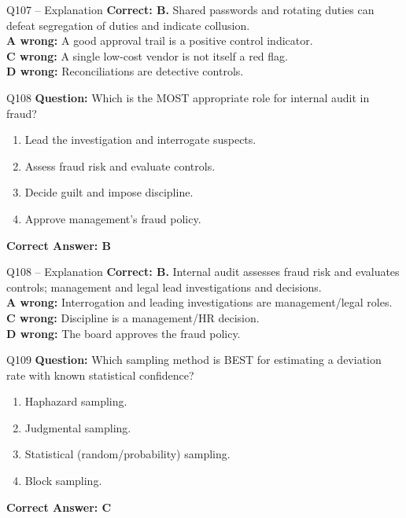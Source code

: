 \documentclass[aspectratio=169,10pt]{beamer}
\begin{document}
	\begin{frame}[t]{Q107 -- Explanation}
		\small
		\textbf{Correct: B.} Shared passwords and rotating duties can defeat segregation of duties and indicate collusion. \\[4pt]
		\textbf{A wrong:} A good approval trail is a positive control indicator. \\[2pt]
		\textbf{C wrong:} A single low-cost vendor is not itself a red flag. \\[2pt]
		\textbf{D wrong:} Reconciliations are detective controls.
	\end{frame}
	
	\begin{frame}[t]{Q108}
		\small
		\textbf{Question:} Which is the MOST appropriate role for internal audit in fraud?
		\begin{enumerate}[label=\Alph*.,itemsep=1pt,topsep=2pt]
			\item Lead the investigation and interrogate suspects.
			\item Assess fraud risk and evaluate controls.
			\item Decide guilt and impose discipline.
			\item Approve management's fraud policy.
		\end{enumerate}
		\vspace{4pt}
		\textbf{Correct Answer: B}
	\end{frame}
	
	\begin{frame}[t]{Q108 -- Explanation}
		\small
		\textbf{Correct: B.} Internal audit assesses fraud risk and evaluates controls; management and legal lead investigations and decisions. \\[4pt]
		\textbf{A wrong:} Interrogation and leading investigations are management/legal roles. \\[2pt]
		\textbf{C wrong:} Discipline is a management/HR decision. \\[2pt]
		\textbf{D wrong:} The board approves the fraud policy.
	\end{frame}
	
	\begin{frame}[t]{Q109}
		\small
		\textbf{Question:} Which sampling method is BEST for estimating a deviation rate with known statistical confidence?
		\begin{enumerate}[label=\Alph*.,itemsep=1pt,topsep=2pt]
			\item Haphazard sampling.
			\item Judgmental sampling.
			\item Statistical (random/probability) sampling.
			\item Block sampling.
		\end{enumerate}
		\vspace{4pt}
		\textbf{Correct Answer: C}
	\end{frame}
	
\end{document}
